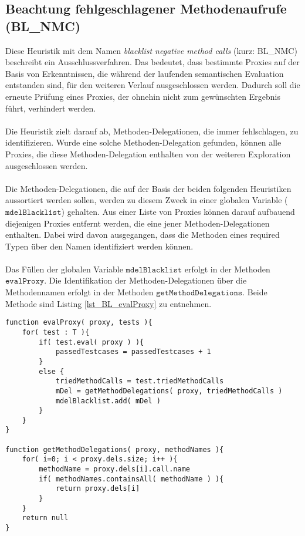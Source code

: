 \subsection{Beachtung fehlgeschlagener Methodenaufrufe (BL\_NMC)}\label{sec_bl_nmc}
Diese Heuristik mit dem Namen \emph{blacklist negative method calls} (kurz: BL\_NMC) beschreibt ein Ausschlussverfahren. Das bedeutet, dass bestimmte Proxies auf der Basis von Erkenntnissen, die während der laufenden semantischen Evaluation entstanden sind, für den weiteren Verlauf ausgeschlossen werden. Dadurch soll die erneute Prüfung eines Proxies, der ohnehin nicht zum gewünschten Ergebnis führt, verhindert werden.
\\\\
Die Heuristik zielt darauf ab, Methoden-Delegationen, die immer fehlschlagen, zu identifizieren. Wurde eine solche Methoden-Delegation gefunden, können alle Proxies, die diese Methoden-Delegation enthalten von der weiteren Exploration ausgeschlossen werden.
\\\\
Die Methoden-Delegationen, die auf der Basis der beiden folgenden Heuristiken aussortiert werden sollen, werden zu diesem Zweck in einer globalen Variable ($\texttt{mdelBlacklist}$) gehalten. Aus einer Liste von Proxies können darauf aufbauend diejenigen Proxies entfernt werden, die eine jener Methoden-Delegationen enthalten. Dabei wird davon ausgegangen, dass die Methoden eines required Typen über den Namen identifiziert werden können.
\\\\
Das Füllen der globalen Variable $\texttt{mdelBlacklist}$ erfolgt in der Methoden $\texttt{evalProxy}$. Die Identifikation der Methoden-Delegationen über die Methodennamen erfolgt in der Methoden $\texttt{getMethodDelegations}$. Beide Methode sind Listing \ref{lst_BL_evalProxy} zu entnehmen.
\begin{lstlisting}[style = pseudo, caption = Evaluierung einzelner Proxies mit BL\_MNC, captionpos = b, label = lst_BL_evalProxy]
function evalProxy( proxy, tests ){
	for( test : T ){	
		if( test.eval( proxy ) ){
			passedTestcases = passedTestcases + 1
		}
		else {
			triedMethodCalls = test.triedMethodCalls
			mDel = getMethodDelegations( proxy, triedMethodCalls )
			mdelBlacklist.add( mDel )
		}		
	}
}

function getMethodDelegations( proxy, methodNames ){
	for( i=0; i < proxy.dels.size; i++ ){
		methodName = proxy.dels[i].call.name
		if( methodNames.containsAll( methodName ) ){
			return proxy.dels[i]
		}
	}
	return null
}
\end{lstlisting}
